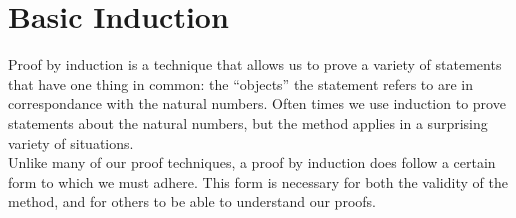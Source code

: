 \chapter{Basic Induction}


\noindent Proof by induction is a technique that allows us to prove a variety of statements that have one thing in common: the ``objects'' the statement refers to are in correspondance with the natural numbers.  Often times we use induction to prove statements about the natural numbers, but the method applies in a surprising variety of situations.\\

Unlike many of our proof techniques, a proof by induction does follow a certain form to which we must adhere.  This form is necessary for both the validity of the method, and for others to be able to understand our proofs.

\begin{center}
\end{center}

